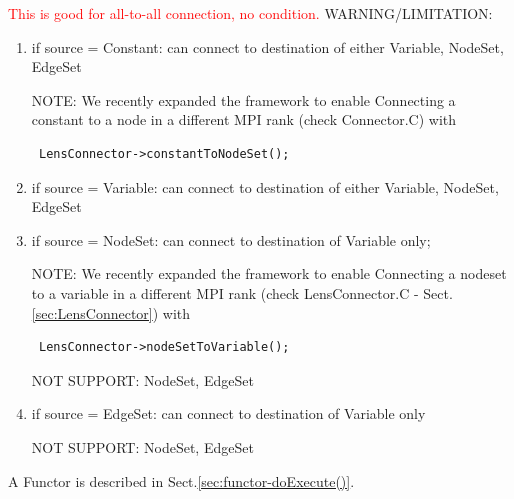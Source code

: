 \textcolor{red}{This is good for all-to-all connection, no condition.}
WARNING/LIMITATION:
\begin{enumerate}
  \item if source = Constant: can connect to destination of either Variable,
  NodeSet, EdgeSet
  
  NOTE: We recently expanded the framework to enable Connecting a constant to a
  node in a different MPI rank (check Connector.C) with
 \begin{verbatim}
 LensConnector->constantToNodeSet();
 \end{verbatim}
  
  \item if source = Variable: can connect to destination of either Variable,
  NodeSet, EdgeSet
  
  \item if source = NodeSet: can connect to destination of Variable only;
  
  NOTE: We recently expanded the framework to enable Connecting a nodeset to a
  variable in a different MPI rank (check LensConnector.C -
  Sect.\ref{sec:LensConnector}) with
 \begin{verbatim}
 LensConnector->nodeSetToVariable();
 \end{verbatim}
  
  NOT SUPPORT:  NodeSet, EdgeSet
  
  \item if source = EdgeSet: can connect to destination of Variable only
  
  NOT SUPPORT:  NodeSet, EdgeSet
  
\end{enumerate}


A Functor is described in Sect.\ref{sec:functor-doExecute()}.


